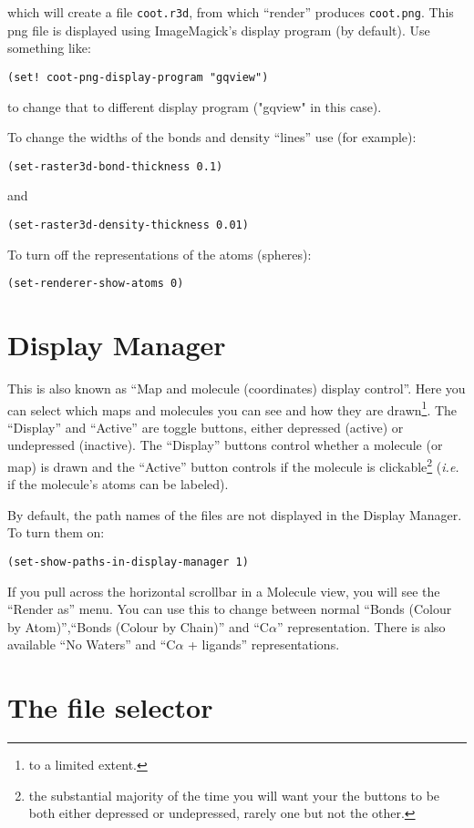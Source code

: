 \documentclass{book}
\begin{document}
which will create a file \texttt{coot.r3d}, from which ``render'' produces
\texttt{coot.png}. This png file is displayed using ImageMagick's display
program (by default).  Use something like:

\texttt{(set! coot-png-display-program "gqview")}

to change that to different display program ("gqview" in this case).

To change the widths of the bonds and density ``lines'' use (for example):

\texttt{(set-raster3d-bond-thickness 0.1)}

and 

\texttt{(set-raster3d-density-thickness 0.01)}

To turn off the representations of the atoms (spheres):

\texttt{(set-renderer-show-atoms 0)}



\section{Display Manager}
\label{sec:display_manager}
 This is also known as ``Map and molecule
(coordinates) display control''.  Here you can select which maps and
molecules you can see and how they are drawn\footnote{to a limited
  extent.}.  The ``Display'' and ``Active'' are toggle buttons, either
depressed (active) or undepressed (inactive).  The ``Display'' buttons
control whether a molecule (or map) is drawn and the ``Active'' button
controls if the molecule is clickable\footnote{the substantial
  majority of the time you will want your the buttons to be both
  either depressed or undepressed, rarely one but not the other.}
(\emph{i.e.} if the molecule's atoms can be labeled).

By default, the path names of the files are not displayed in the
Display Manager.  To turn them on:

\texttt{(set-show-paths-in-display-manager 1)}

If you pull across the
horizontal scrollbar in a Molecule view, you will see the ``Render
as'' menu.  You can use this to change between normal ``Bonds (Colour
by Atom)'',``Bonds (Colour by Chain)'' and ``C$\alpha$''
representation.  There is also
available ``No Waters'' and ``C$\alpha$ + ligands'' representations.

\section{The file selector}
\end{document}
